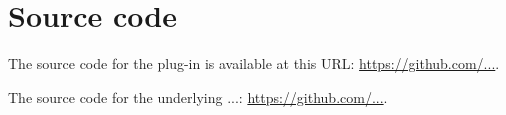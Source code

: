 \chapter{Source code} \label{SourceCode}

The source code for the plug-in is available at this URL: \url{https://github.com/...}.

The source code for the underlying ...: \url{https://github.com/...}.
